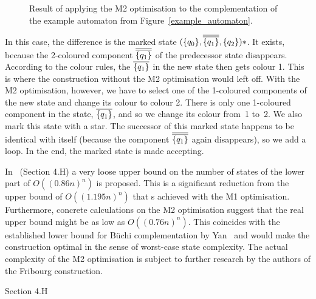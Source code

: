 \begin{figure}
\centering
\ComplementWithMTwo
\caption{Result of applying the M2 optimisation to the complementation of the example automaton from Figure~\ref{example_automaton}.}
\label{complement_with_m2}
\end{figure}

In this case, the difference is the marked state $(\qm0, \cl2{\qm1}, \qm2)*$. It exists, because the 2-coloured component $\cl2{\qm1}$ of the predecessor state disappears. According to the colour rules, the $\cl1{\qm1}$ in the new state then gets colour 1. This is where the construction without the M2 optimisation would left off. With the M2 optimisation, however, we have to select one of the 1-coloured components of the new state and change its colour to colour 2. There is only one 1-coloured component in the state, $\cl1{\qm1}$, and so we change its colour from~1 to~2. We also mark this state with a star. The successor of this marked state happens to be identical with itself (because the component $\cl2{\qm1}$ again disappears), so we add a loop. In the end, the marked state is made accepting.

In~\cite{2014_joel_ulrich} (Section 4.H) a very loose upper bound on the number of states of the lower part of $O((0.86n)^n)$ is proposed. This is a significant reduction from the upper bound of $O((1.195n)^n)$ that s achieved with the M1 optimisation. Furthermore, concrete calculations on the M2 optimisation suggest that the real upper bound might be as low as $O((0.76n)^n)$. This coincides with the established lower bound for Büchi complementation by Yan~\cite{DBLP:journals/corr/abs-0802-1226} and would make the construction optimal in the sense of worst-case state complexity. The actual complexity of the M2 optimisation is subject to further research by the authors of the Fribourg construction.



\cite{2014_joel_ulrich} Section 4.H




